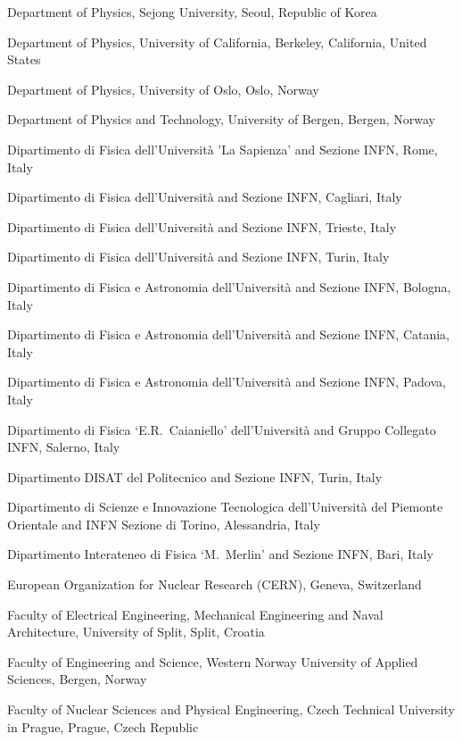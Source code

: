 \begin{flushleft}
\begin{Authlist}
\item {}Department of Physics, Sejong University, Seoul, Republic of Korea
\item {}Department of Physics, University of California, Berkeley, California, United States
\item {}Department of Physics, University of Oslo, Oslo, Norway
\item {}Department of Physics and Technology, University of Bergen, Bergen, Norway
\item {}Dipartimento di Fisica dell'Universit\`{a} 'La Sapienza' and Sezione INFN, Rome, Italy
\item {}Dipartimento di Fisica dell'Universit\`{a} and Sezione INFN, Cagliari, Italy
\item {}Dipartimento di Fisica dell'Universit\`{a} and Sezione INFN, Trieste, Italy
\item {}Dipartimento di Fisica dell'Universit\`{a} and Sezione INFN, Turin, Italy
\item {}Dipartimento di Fisica e Astronomia dell'Universit\`{a} and Sezione INFN, Bologna, Italy
\item {}Dipartimento di Fisica e Astronomia dell'Universit\`{a} and Sezione INFN, Catania, Italy
\item {}Dipartimento di Fisica e Astronomia dell'Universit\`{a} and Sezione INFN, Padova, Italy
\item {}Dipartimento di Fisica `E.R.~Caianiello' dell'Universit\`{a} and Gruppo Collegato INFN, Salerno, Italy
\item {}Dipartimento DISAT del Politecnico and Sezione INFN, Turin, Italy
\item {}Dipartimento di Scienze e Innovazione Tecnologica dell'Universit\`{a} del Piemonte Orientale and INFN Sezione di Torino, Alessandria, Italy
\item {}Dipartimento Interateneo di Fisica `M.~Merlin' and Sezione INFN, Bari, Italy
\item {}European Organization for Nuclear Research (CERN), Geneva, Switzerland
\item {}Faculty of Electrical Engineering, Mechanical Engineering and Naval Architecture, University of Split, Split, Croatia
\item {}Faculty of Engineering and Science, Western Norway University of Applied Sciences, Bergen, Norway
\item {}Faculty of Nuclear Sciences and Physical Engineering, Czech Technical University in Prague, Prague, Czech Republic

\end{Authlist}
\end{flushleft}
